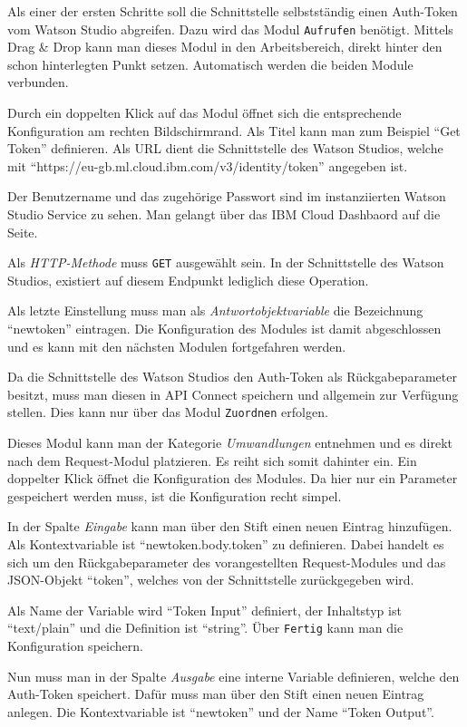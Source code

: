 Als einer der ersten Schritte soll die Schnittstelle selbstständig einen Auth-Token vom Watson Studio abgreifen. Dazu
wird das Modul \texttt{Aufrufen} benötigt. Mittels Drag \& Drop kann man dieses Modul in den Arbeitsbereich, direkt
hinter den schon hinterlegten Punkt setzen. Automatisch werden die beiden Module verbunden.

Durch ein doppelten Klick auf das Modul öffnet sich die entsprechende Konfiguration am rechten Bildschirmrand. Als Titel
kann man zum Beispiel \enquote{Get Token} definieren. Als URL dient die Schnittstelle des Watson Studios, welche mit
\enquote{https://eu-gb.ml.cloud.ibm.com/v3/identity/token} angegeben ist.

Der Benutzername und das zugehörige Passwort sind im instanziierten Watson Studio Service zu sehen. Man gelangt über das
IBM Cloud Dashbaord auf die Seite.

Als \textit{HTTP-Methode} muss \texttt{GET} ausgewählt sein. In der Schnittstelle des Watson Studios, existiert auf
diesem Endpunkt lediglich diese Operation.

Als letzte Einstellung muss man als \textit{Antwortobjektvariable} die Bezeichnung \enquote{newtoken} eintragen. Die
Konfiguration des Modules ist damit abgeschlossen und es kann mit den nächsten Modulen fortgefahren werden.

Da die Schnittstelle des Watson Studios den Auth-Token als Rückgabeparameter besitzt, muss man diesen in API Connect
speichern und allgemein zur Verfügung stellen. Dies kann nur über das Modul \texttt{Zuordnen} erfolgen.

Dieses Modul kann man der Kategorie \textit{Umwandlungen} entnehmen und es direkt nach dem Request-Modul platzieren. Es
reiht sich somit dahinter ein. Ein doppelter Klick öffnet die Konfiguration des Modules. Da hier nur ein Parameter
gespeichert werden muss, ist die Konfiguration recht simpel.

In der Spalte \textit{Eingabe} kann man über den Stift einen neuen Eintrag hinzufügen. Als Kontextvariable ist
\enquote{newtoken.body.token} zu definieren. Dabei handelt es sich um den Rückgabeparameter des vorangestellten
Request-Modules und das JSON-Objekt \enquote{token}, welches von der Schnittstelle zurückgegeben wird.

Als Name der Variable wird \enquote{Token Input} definiert, der Inhaltstyp ist \enquote{text/plain} und die Definition
ist \enquote{string}. Über \texttt{Fertig} kann man die Konfiguration speichern.

Nun muss man in der Spalte \textit{Ausgabe} eine interne Variable definieren, welche den Auth-Token speichert. Dafür
muss man über den Stift einen neuen Eintrag anlegen. Die Kontextvariable ist \enquote{newtoken} und der Name
\enquote{Token Output}.

